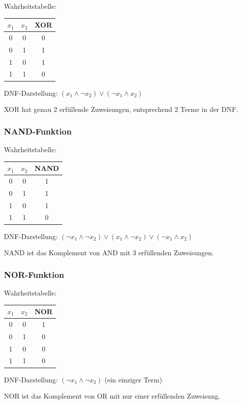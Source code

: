 ﻿\documentclass[a4paper,12pt]{article}
\theoremstyle{definition}
\begin{document}
Wahrheitstabelle:
\begin{center}
\begin{tabular}{cc|c}
$x_1$ & $x_2$ & XOR \\
\hline
0 & 0 & 0 \\
0 & 1 & 1 \\
1 & 0 & 1 \\
1 & 1 & 0
\end{tabular}
\end{center}

DNF-Darstellung: $(x_1 \land \neg x_2) \lor (\neg x_1 \land x_2)$

XOR hat genau 2 erfüllende Zuweisungen, entsprechend 2 Terme in der DNF.

\subsubsection{NAND-Funktion}

Wahrheitstabelle:
\begin{center}
\begin{tabular}{cc|c}
$x_1$ & $x_2$ & NAND \\
\hline
0 & 0 & 1 \\
0 & 1 & 1 \\
1 & 0 & 1 \\
1 & 1 & 0
\end{tabular}
\end{center}

DNF-Darstellung: $(\neg x_1 \land \neg x_2) \lor (x_1 \land \neg x_2) \lor (\neg x_1 \land x_2)$

NAND ist das Komplement von AND mit 3 erfüllenden Zuweisungen.

\subsubsection{NOR-Funktion}

Wahrheitstabelle:
\begin{center}
\begin{tabular}{cc|c}
$x_1$ & $x_2$ & NOR \\
\hline
0 & 0 & 1 \\
0 & 1 & 0 \\
1 & 0 & 0 \\
1 & 1 & 0
\end{tabular}
\end{center}

DNF-Darstellung: $(\neg x_1 \land \neg x_2)$ (ein einziger Term)

NOR ist das Komplement von OR mit nur einer erfüllenden Zuweisung.
\end{document}
